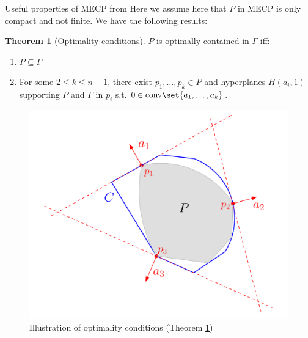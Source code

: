 \documentclass{article}
\theoremstyle{definition}
\newtheorem{theo}{Theorem}[section]
\theoremstyle{remark}
\begin{document}
\begin{subsection}{Useful properties of MECP from \cite{BK13,BR09}}
  Here we assume here that $P$ in MECP is only compact and not finite. We have the following results:
  \begin{theo}[Optimality conditions]
    \label{optCond}
    $P$ is optimally contained in $\Gamma$ iff:
    \begin{enumerate}
    \item $P \subseteq \Gamma$
    \item For some $2 \leq k \leq n + 1$, there exist $p_1, \ldots , p_k \in P$ and hyperplanes $H(a_i,1)$ supporting $P$ and $\Gamma$ in $p_i$ s.t. $0  \in \text{conv}\set{a_1,\ldots,a_k}$.
    \end{enumerate}
  \end{theo}
  
  \begin{figure}[!h]
    \begin{center}
      \includegraphics[scale=0.2]{optCond.png}
    \end{center}
    \caption{Illustration of optimality conditions (Theorem \ref{optCond})}
  \end{figure}


\end{subsection}
\end{document}
